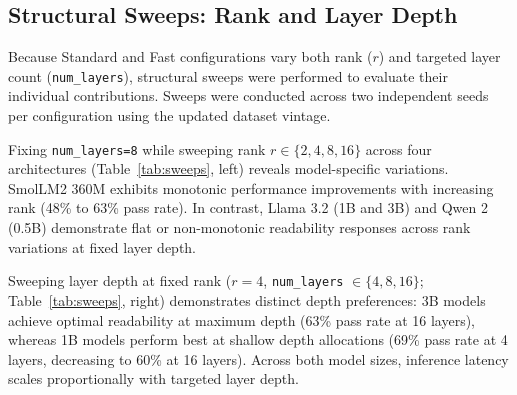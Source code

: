\documentclass[pdflatex,sn-mathphys-num]{sn-jnl-official}%
\begin{document}
\subsection{Structural Sweeps: Rank and Layer Depth}\label{sec:ranksweep}

Because Standard and Fast configurations vary both rank ($r$) and targeted layer count (\texttt{num\_layers}), structural sweeps were performed to evaluate their individual contributions. Sweeps were conducted across two independent seeds per configuration using the updated dataset vintage.

Fixing \texttt{num\_layers=8} while sweeping rank $r \in \{2,4,8,16\}$ across four architectures (Table~\ref{tab:sweeps}, left) reveals model-specific variations. SmolLM2 360M exhibits monotonic performance improvements with increasing rank (48\% to 63\% pass rate). In contrast, Llama 3.2 (1B and 3B) and Qwen 2 (0.5B) demonstrate flat or non-monotonic readability responses across rank variations at fixed layer depth.

Sweeping layer depth at fixed rank ($r=4$, \texttt{num\_layers} $\in \{4,8,16\}$; Table~\ref{tab:sweeps}, right) demonstrates distinct depth preferences: 3B models achieve optimal readability at maximum depth (63\% pass rate at 16 layers), whereas 1B models perform best at shallow depth allocations (69\% pass rate at 4 layers, decreasing to 60\% at 16 layers). Across both model sizes, inference latency scales proportionally with targeted layer depth.
\end{document}
